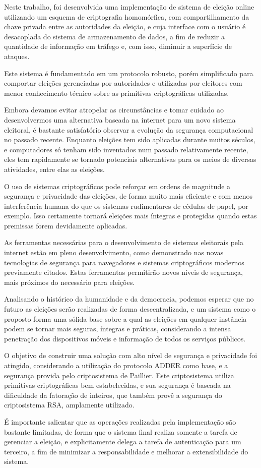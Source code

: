 Neste trabalho, foi desenvolvida uma implementação de sistema de eleição online
utilizando um esquema de criptografia homomórfica, com compartilhamento da
chave privada entre as autoridades da eleição, e cuja interface com o usuário é
desacoplada do sistema de armazenamento de dados, a fim de reduzir a quantidade
de informação em tráfego e, com isso, diminuir a superfície de ataques.

Este sistema é fundamentado em um protocolo robusto, porém simplificado para
comportar eleições gerenciadas por autoridades e utilizadas por eleitores com
menor conhecimento técnico sobre as primitivas criptográficas utilizadas.

Embora devamos evitar atropelar as circunstâncias e tomar cuidado ao
desenvolvermos uma alternativa baseada na internet para um novo sistema
eleitoral, é bastante satisfatório observar a evolução da segurança
computacional no passado recente. Enquanto eleições tem sido aplicadas durante
muitos séculos, e computadores só tenham sido inventados num passado
relativamente recente, eles tem rapidamente se tornado potenciais alternativas
para os meios de diversas atividades, entre elas as eleições.

O uso de sistemas criptográficos pode reforçar em ordens de magnitude a
segurança e privacidade das eleições, de forma muito mais eficiente e com menos
interferência humana do que os sistemas rudimentares de cédulas de papel, por
exemplo. Isso certamente tornará eleições mais íntegras e protegidas quando
estas premissas forem devidamente aplicadas.

As ferramentas necessárias para o desenvolvimento de sistemas eleitorais pela
internet estão em pleno desenvolvimento, como demonstrado nas novas tecnologias
de segurança para navegadores e sistemas criptográficos modernos previamente
citados. Estas ferramentas permitirão novos níveis de segurança, mais próximos
do necessário para eleições.

Analisando o histórico da humanidade e da democracia, podemos esperar que no
futuro as eleições serão realizadas de forma descentralizada, e um sistema como
o proposto forma uma sólida base sobre a qual as eleições em qualquer instância
podem se tornar mais seguras, íntegras e práticas, considerando a intensa
penetração dos dispositivos móveis e informação de todos os serviços públicos.

O objetivo de construir uma solução com alto nível de segurança e privacidade
foi atingido, considerando a utilização do protocolo ADDER como base, e a
segurança provida pelo criptosistema de Paillier. Este criptosistema utiliza
primitivas criptográficas bem estabelecidas, e sua segurança é baseada na
dificuldade da fatoração de inteiros, que também provê a segurança do
criptosistema RSA, amplamente utilizado.

É importante salientar que as operações realizadas pela implementação são
bastante limitadas, de forma que o sistema final realiza somente a tarefa de
gerenciar a eleição, e explicitamente delega a tarefa de autenticação para um
terceiro, a fim de minimizar a responsabilidade e melhorar a extensibilidade do
sistema.
